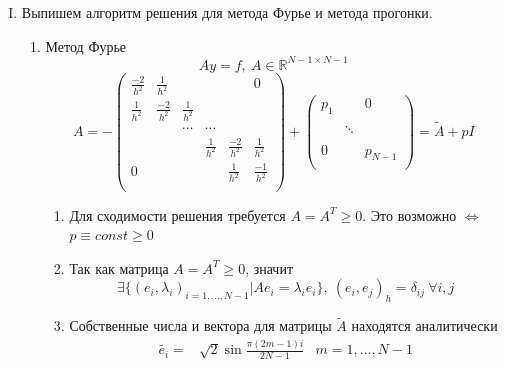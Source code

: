 \documentclass[12pt]{article}
\begin{document}
\begin{enumerate}[I.]
	\item Выпишем алгоритм решения для метода Фурье и метода прогонки.
	      \begin{enumerate}
		      \item Метод Фурье
		            \[Ay=f,\ A\in \mathbb{R}^{N-1\times N-1}\]
		            \[A=
			            -\left(\begin{array}{cccccc}
					            \frac{-2}{h^2} & \frac{1}{h^2}  &               &               &                & 0              \\
					            \frac{1}{h^2}  & \frac{-2}{h^2} & \frac{1}{h^2} &               &                &                \\
					                           &                & \cdots        & \cdots        &                &                \\
					                           &                &               & \frac{1}{h^2} & \frac{-2}{h^2} & \frac{1}{h^2}  \\
					            0              &                &               &               & \frac{1}{h^2}  & \frac{-1}{h^2} \\
				            \end{array}\right)
			            +
			            \left(\begin{array}{ccc}
					            p_1 &        & 0       \\
					                &        &         \\
					                & \ddots &         \\
					                &        &         \\
					            0   &        & p_{N-1} \\
				            \end{array}\right)
			            =\tilde{A} +pI\]
		            \begin{enumerate}
			            \item Для сходимости решения требуется $A=A^T\geq0$. Это возможно $\Leftrightarrow$ $p\equiv const\geq0$
			            \item Так как матрица $A=A^T\geq0$, значит
			                  \[\exists\{(e_i,\lambda_i)_{i=1,\ldots,N-1}|Ae_i=\lambda_ie_i\},\ (e_i,e_j)_h=\delta_{ij}\ \forall i,j \]
			            \item Собственные числа и вектора для матрицы $\tilde{A}$ находятся аналитически
			                  \begin{align*}
				                  \tilde{e_i}=     & \sqrt{2}\sin\frac{\pi(2m-1)i}{2N-1}                       & m=1,\ldots,N-1 \\

\end{align*}
\end{enumerate}
\end{enumerate}
\end{enumerate}
\end{document}

